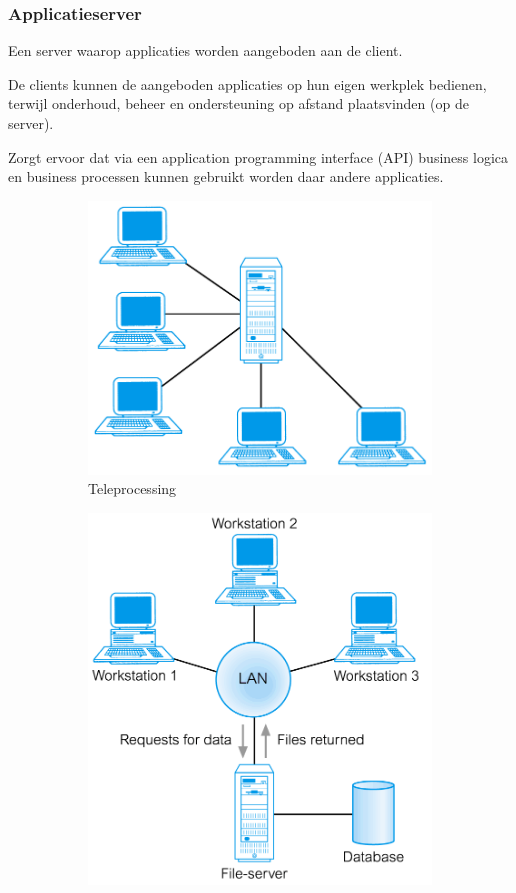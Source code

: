 \documentclass[a4paper,12pt]{article}
\begin{document}
\subsubsection{Applicatieserver}
Een server waarop applicaties worden aangeboden aan de client.

De clients kunnen de aangeboden applicaties op hun eigen werkplek bedienen, terwijl onderhoud, beheer en ondersteuning op afstand plaatsvinden (op de server).

Zorgt ervoor dat via een application programming interface (API) business logica en business processen kunnen gebruikt worden daar andere applicaties.

\begin{figure}[H]
\centering
\begin{subfigure}{.49\textwidth}
  \centering
  \includegraphics[width=.9\linewidth]{img/Teleprocessing.png}
  \caption{Teleprocessing}
  \label{fig:Teleprocessing}
\end{subfigure}
\begin{subfigure}{.49\textwidth}
  \centering
  \includegraphics[width=.9\linewidth]{img/FileServer.png}

\end{subfigure}
\end{figure}
\end{document}
